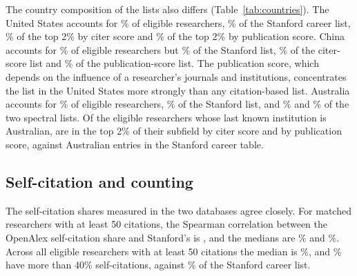 \begin{table}[t]
\centering
\caption{Top-2\% lists formed within OpenAlex subfields on each spectral score. ``\% on Stanford list'' is the share of the spectral top 2\% matched to a researcher in the Stanford career table, a lower bound because some Stanford researchers are not matched. The last column is the share of matched Stanford researchers who fall in the spectral top 2\%.}
\label{tab:top2}
\small

\end{table}

The country composition of the lists also differs (Table~\ref{tab:countries}). The United States accounts for \NShareUsAll{}\% of eligible researchers, \NShareUsSt{}\% of the Stanford career list, \NShareUsCit{}\% of the top 2\% by citer score and \NShareUsPub{}\% of the top 2\% by publication score. China accounts for \NShareCnAll{}\% of eligible researchers but \NShareCnSt{}\% of the Stanford list, \NShareCnCit{}\% of the citer-score list and \NShareCnPub{}\% of the publication-score list. The publication score, which depends on the influence of a researcher's journals and institutions, concentrates the list in the United States more strongly than any citation-based list. Australia accounts for \NShareAuAll{}\% of eligible researchers, \NShareAuSt{}\% of the Stanford list, and \NShareAuCit{}\% and \NShareAuPub{}\% of the two spectral lists. Of the \NAuEligible{} eligible researchers whose last known institution is Australian, \NAuTopCitfracns{} are in the top 2\% of their subfield by citer score and \NAuTopPubfrac{} by publication score, against \NAuStCareer{} Australian entries in the Stanford career table.

\begin{table}[t]
\centering
\caption{Country shares (\%) of the Stanford career list, of the spectral top-2\% lists, and of all eligible OpenAlex researchers, for the twelve countries with the most Stanford-listed researchers. Countries are the researcher's most recent country in each database.}
\label{tab:countries}
\small

\end{table}

\subsection{Self-citation and counting}

The self-citation shares measured in the two databases agree closely. For matched researchers with at least 50 citations, the Spearman correlation between the OpenAlex self-citation share and Stanford's is \NSelfRho{}, and the medians are \NSelfMedOurs{}\% and \NSelfMedSt{}\%. Across all eligible researchers with at least 50 citations the median is \NSelfMedAll{}\%, and \NSelfOverFortyPct{}\% have more than 40\% self-citations, against \NStSelfOverFortyPct{}\% of the Stanford career list.

